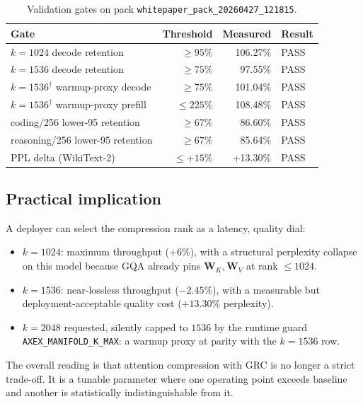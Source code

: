 \documentclass[11pt]{article}
\providecommand{\Wmat}{\mathbf{W}}
\begin{document}
\begin{table}[h]\centering\footnotesize
\caption{Validation gates on pack \texttt{whitepaper\_pack\_20260427\_121815}.}
\begin{tabular}{@{}lrrl@{}}
\toprule
Gate & Threshold & Measured & Result\\
\midrule
$k{=}1024$ decode retention             & $\geq 95\%$ & 106.27\% & PASS\\
$k{=}1536$ decode retention             & $\geq 75\%$ &  97.55\% & PASS\\
$k{=}1536^\dagger$ warmup-proxy decode  & $\geq 75\%$ & 101.04\% & PASS\\
$k{=}1536^\dagger$ warmup-proxy prefill & $\leq 225\%$& 108.48\% & PASS\\
coding/256 lower-95 retention           & $\geq 67\%$ &  86.60\% & PASS\\
reasoning/256 lower-95 retention        & $\geq 67\%$ &  85.64\% & PASS\\
PPL delta (WikiText-2)                  & $\leq +15\%$&  +13.30\% & PASS\\
\bottomrule
\end{tabular}
\end{table}

\subsection{Practical implication}

A deployer can select the compression rank as a latency, quality dial:
\begin{itemize}
\item $k{=}1024$: maximum throughput ($+6\%$), with a structural
perplexity collapse on this model because GQA already pins
$\Wmat_K,\Wmat_V$ at rank $\leq 1024$.
\item $k{=}1536$: near-lossless throughput ($-2.45\%$), with a measurable
but deployment-acceptable quality cost ($+13.30\%$ perplexity).
\item $k{=}2048$ requested, silently capped to $1536$ by the runtime
guard \texttt{AXEX\_MANIFOLD\_K\_MAX}: a warmup proxy at parity with the
$k{=}1536$ row.
\end{itemize}
The overall reading is that attention compression with GRC is no longer a
strict trade-off. It is a tunable parameter where one operating point
exceeds baseline and another is statistically indistinguishable from it.

\clearpage
\printbibliography
\end{document}
